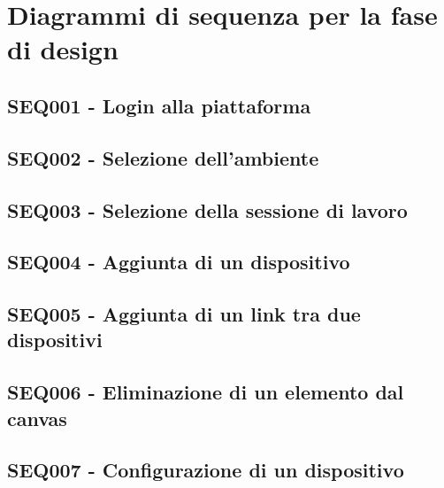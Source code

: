 \documentclass[../main.tex]{subfiles}
\begin{document}
\section{Diagrammi di sequenza per la fase di design}

\subsection{SEQ001 - Login alla piattaforma }
\figure[H]
\centering

\endfigure
\vfill\newpage

\subsection{SEQ002 - Selezione dell'ambiente }
\figure[H]
\centering

\endfigure
\vfill\newpage

\subsection{SEQ003 - Selezione della sessione di lavoro }
\figure[H]
\centering

\endfigure
\vfill\newpage
\subsection{SEQ004 - Aggiunta di un dispositivo }
\figure[H]
\centering

\endfigure
\vfill\newpage
\subsection{SEQ005 - Aggiunta di un link tra due dispositivi }
\figure[H]
\centering

\endfigure
\vfill\newpage
\subsection{SEQ006 - Eliminazione di un elemento dal canvas }
\figure[H]
\centering

\endfigure
\vfill\newpage
\subsection{SEQ007 - Configurazione di un dispositivo }
\figure[H]
\centering

\endfigure
\vfill\newpage
\end{document}
